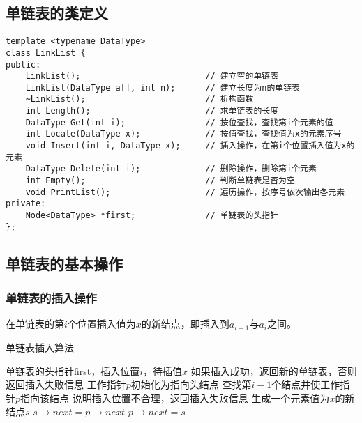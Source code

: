 \documentclass[12pt,a4paper]{amsart}
\begin{document}
\subsection{单链表的类定义}

\indent

\begin{lstlisting}[caption=单链表类定义]
template <typename DataType>
class LinkList {
public:
    LinkList();                         // 建立空的单链表
    LinkList(DataType a[], int n);      // 建立长度为n的单链表
    ~LinkList();                        // 析构函数
    int Length();                       // 求单链表的长度
    DataType Get(int i);                // 按位查找，查找第i个元素的值
    int Locate(DataType x);             // 按值查找，查找值为x的元素序号
    void Insert(int i, DataType x);     // 插入操作，在第i个位置插入值为x的元素
    DataType Delete(int i);             // 删除操作，删除第i个元素
    int Empty();                        // 判断单链表是否为空
    void PrintList();                   // 遍历操作，按序号依次输出各元素
private:
    Node<DataType> *first;              // 单链表的头指针
};
\end{lstlisting}

\subsection{单链表的基本操作}

\subsubsection{单链表的插入操作}

在单链表的第$i$个位置插入值为$x$的新结点，即插入到$a_{i-1}$与$a_i$之间。

\begin{algorithm}[H]
\caption{单链表插入算法}
\begin{algorithmic}[1]
\REQUIRE 单链表的头指针first，插入位置$i$，待插值$x$
\ENSURE 如果插入成功，返回新的单链表，否则返回插入失败信息
\STATE 工作指针$p$初始化为指向头结点
\STATE 查找第$i-1$个结点并使工作指针$p$指向该结点
    \STATE 说明插入位置不合理，返回插入失败信息
\ELSE
    \STATE 生成一个元素值为$x$的新结点$s$
    \STATE $s \rightarrow next = p \rightarrow next$
    \STATE $p \rightarrow next = s$
\ENDIF
\end{algorithmic}
\end{algorithm}
\end{document}
